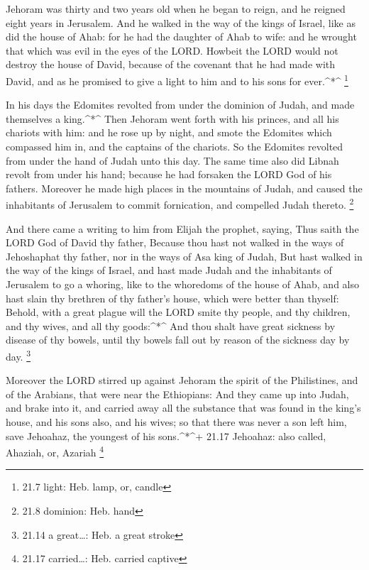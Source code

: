  Jehoram was thirty and two years old when he began to
reign, and he reigned eight years in Jerusalem.  And he
walked in the way of the kings of Israel, like as did the house of Ahab:
for he had the daughter of Ahab to wife: and he wrought that which was
evil in the eyes of the LORD.  Howbeit the LORD would not
destroy the house of David, because of the covenant that he had made
with David, and as he promised to give a light to him and to his sons
for ever.\^{}*\^{} \footnote{21.7 light: Heb. lamp, or, candle}

 In his days the Edomites revolted from under the dominion
of Judah, and made themselves a king.\^{}*\^{}  Then Jehoram
went forth with his princes, and all his chariots with him: and he rose
up by night, and smote the Edomites which compassed him in, and the
captains of the chariots.  So the Edomites revolted from
under the hand of Judah unto this day. The same time also did Libnah
revolt from under his hand; because he had forsaken the LORD God of his
fathers.  Moreover he made high places in the mountains of
Judah, and caused the inhabitants of Jerusalem to commit fornication,
and compelled Judah thereto. \footnote{21.8 dominion: Heb. hand}

 And there came a writing to him from Elijah the prophet,
saying, Thus saith the LORD God of David thy father, Because thou hast
not walked in the ways of Jehoshaphat thy father, nor in the ways of Asa
king of Judah,  But hast walked in the way of the kings of
Israel, and hast made Judah and the inhabitants of Jerusalem to go a
whoring, like to the whoredoms of the house of Ahab, and also hast slain
thy brethren of thy father's house, which were better than thyself:
 Behold, with a great plague will the LORD smite thy
people, and thy children, and thy wives, and all thy goods:\^{}*\^{}
 And thou shalt have great sickness by disease of thy
bowels, until thy bowels fall out by reason of the sickness day by day.
\footnote{21.14 a great\ldots: Heb. a great stroke}

 Moreover the LORD stirred up against Jehoram the spirit of
the Philistines, and of the Arabians, that were near the Ethiopians:
 And they came up into Judah, and brake into it, and
carried away all the substance that was found in the king's house, and
his sons also, and his wives; so that there was never a son left him,
save Jehoahaz, the youngest of his sons.\^{}*\^{}+ 21.17 Jehoahaz: also
called, Ahaziah, or, Azariah \footnote{21.17 carried\ldots: Heb. carried
  captive}

